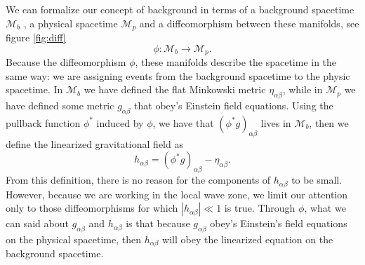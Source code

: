 We can formalize our concept of background in terms of a background
spacetime $\mathcal{M}_{b}$ , a physical spacetime $\mathcal{M}_{p}$
and a diffeomorphism between these manifolds, see figure \ref{fig:diff}
\[
\phi:\mathcal{M}_{b}\rightarrow\mathcal{M}_{p}.
\]
Because the diffeomorphism $\phi$, these manifolds describe the spacetime
in the same way: we are assigning events from the background spacetime
to the physic spacetime. In $\mathcal{M}_{b}$ we have defined the
flat Minkowski metric $\eta_{\alpha\beta}$, while in $\mathcal{M}_{p}$
we have defined some metric $g_{\alpha\beta}$ that obey's Einstein
field equations. Using the pullback function $\phi^{*}$ induced by
$\phi$, we have that $\left(\phi^{*}g\right)_{\alpha\beta}$ lives
in $\mathcal{M}_{b}$, then we define the linearized gravitational
field as
\begin{equation}
h_{\alpha\beta}=\left(\phi^{*}g\right)_{\alpha\beta}-\eta_{\alpha\beta}.\label{hd}
\end{equation}
From this definition, there is no reason for the components of $h_{\alpha\beta}$
to be small. However, because we are working in the local wave zone,
we limit our attention only to those diffeomorphisms for which $\left|h_{\alpha\beta}\right|\ll1$
is true. Through $\phi$, what we can said about $g_{\alpha\beta}$
and $h_{\alpha\beta}$ is that because $g_{\alpha\beta}$ obey's Einstein's
field equations on the physical spacetime, then $h_{\alpha\beta}$
will obey the linearized equation on the background spacetime.


